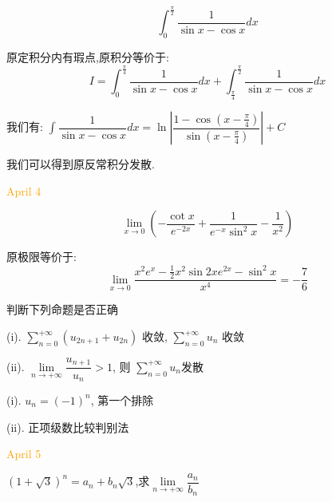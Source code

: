 \begin{example}[][Exam: 30.1.6]
	$$\int_{0}^{\frac{\pi}{2}}\dfrac{1}{\sin x-\cos x}dx$$
\end{example}
\begin{solution}
	
	原定积分内有瑕点,原积分等价于: 
	$$I=\int_{0}^{\frac{\pi}{4}}\frac{1}{\sin x-\cos x}dx+\int_{\frac{\pi}{4}}^{\frac{\pi}{2}}\frac{1}{\sin x-\cos x}dx$$
	
	我们有: $\int\dfrac{1}{\sin x-\cos x}dx=\ln|\dfrac{1-\cos(x-\frac{\pi}{4})}{\sin(x-\frac{\pi}{4})}|+C$
	
	我们可以得到原反常积分发散.
\end{solution}


\textcolor{orange}{April 4}

\begin{example}[][Exam: 30.1.7]
	$$\lim\limits_{x\to 0}\left( -\dfrac{\cot x}{e^{-2x}}+\dfrac{1}{e^{-x}\sin^2 x}-\dfrac{1}{x^2}\right)$$
\end{example}
\begin{solution}
	
	原极限等价于: 
	$$\lim\limits_{x\to 0}\frac{x^2e^{x}-\frac{1}{2}x^2\sin 2xe^{2x}-\sin^2 x}{x^4}=-\frac{7}{6}$$
\end{solution}

\begin{example}[][Exam: 30.1.8]
	判断下列命题是否正确 

(i). $\sum\limits_{n=0}^{+\infty}(u_{2n+1}+u_{2n})$ 收敛, $\sum\limits_{n=0}^{+\infty}u_{n}$ 收敛

(ii). $\lim\limits_{n\to +\infty}\dfrac{u_{n+1}}{u_{n}}>1$, 则 $\sum\limits_{n=0}^{+\infty}u_{n}$发散
\end{example}
\begin{solution}
	
	(i). $u_{n}=(-1)^{n}$, 第一个排除
	
	(ii). 正项级数比较判别法
\end{solution}

\textcolor{orange}{April 5}

\begin{example}[][Exam: 30.1.9]
	$(1+\sqrt{3})^{n}=a_{n}+b_{n}\sqrt{3}$,求$\lim\limits_{n\to +\infty}\dfrac{a_{n}}{b_{n}}$
\end{example}

